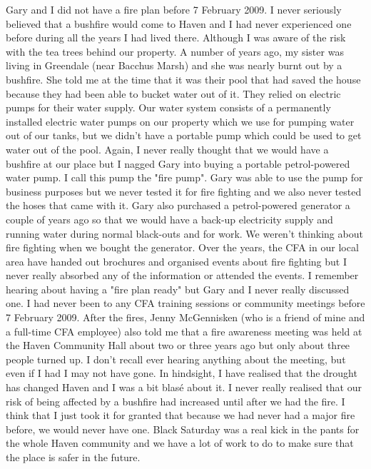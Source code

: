 \documentclass[a4paper]{article}
\begin{document}
    Gary and I did not have a fire plan before 7 February 2009. I never seriously believed that a bushfire would come to Haven and I had never experienced one before during all the years I had lived there. Although I was aware of the risk with the tea trees behind our property.
    A number of years ago, my sister was living in Greendale (near Bacchus Marsh) and she was nearly burnt out by a bushfire. She told me at the time that it was their pool that had saved the house because they had been able to bucket water out of it. They relied on electric pumps for their water supply. Our water system consists of a permanently installed electric water pumps on our property which we use for pumping water out of our tanks, but we didn't have a portable pump which could be used to get water out of the pool. Again, I never really thought that we would have a bushfire at our place but I nagged Gary into buying a portable petrol-powered water pump. I call this pump the "fire pump". Gary was able to use the pump for business purposes but we never tested it for fire fighting and we also never tested the hoses that came with it. Gary also purchased a petrol-powered generator a couple of years ago so that we would have a back-up electricity supply and running water during normal black-outs and for work. We weren't thinking about fire fighting when we bought the generator.
    Over the years, the CFA in our local area have handed out brochures and organised events about fire fighting but I never really absorbed any of the information or attended the events. I remember hearing about having a "fire plan ready" but Gary and I never really discussed one. I had never been to any CFA training sessions or community meetings before 7 February 2009. After the fires, Jenny McGennisken (who is a friend of mine and a full-time CFA employee) also told me that a fire awareness meeting was held at the Haven Community Hall about two or three years ago but only about three people turned up. I don't recall ever hearing anything about the meeting, but even if I had I may not have gone.
    In hindsight, I have realised that the drought has changed Haven and I was a bit blasé about it. I never really realised that our risk of being affected by a bushfire had increased until after we had the fire. I think that I just took it for granted that because we had never had a major fire before, we would never have one. Black Saturday was a real kick in the pants for the whole Haven community and we have a lot of work to do to make sure that the place is safer in the future.
\end{document}
